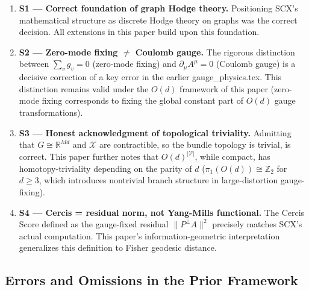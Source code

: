 \documentclass[12pt,a4paper]{article}
\theoremstyle{definition}
\theoremstyle{remark}
\theoremstyle{definition}
\newcommand{\R}{\mathbb{R}}
\newcommand{\Z}{\mathbb{Z}}
\newcommand{\Od}{O(d)}
\newcommand{\verts}{\mathcal{V}}
\newcommand{\base}{\mathcal{X}}
\begin{document}
\begin{enumerate}[label=S\arabic*:, leftmargin=*]
    \item \textbf{S1 — Correct foundation of graph Hodge theory.}
    Positioning SCX's mathematical structure as discrete Hodge theory on graphs was the correct decision.
    All extensions in this paper build upon this foundation.

    \item \textbf{S2 — Zero-mode fixing $\neq$ Coulomb gauge.}
    The rigorous distinction between $\sum_v g_v = 0$ (zero-mode fixing) and $\partial_\mu A^\mu = 0$ (Coulomb gauge)
    is a decisive correction of a key error in the earlier gauge\_physics.tex.
    This distinction remains valid under the $O(d)$ framework of this paper (zero-mode fixing corresponds to fixing the global constant part of $O(d)$ gauge transformations).

    \item \textbf{S3 — Honest acknowledgment of topological triviality.}
    Admitting that $G \cong \R^{Md}$ and $\base$ are contractible, so the bundle topology is trivial, is correct.
    This paper further notes that $\Od^{|\verts|}$, while compact, has homotopy-triviality depending on the parity of $d$
    ($\pi_1(\Od) \cong \Z_2$ for $d \geq 3$, which introduces nontrivial branch structure in large-distortion gauge-fixing).

    \item \textbf{S4 — Cercis = residual norm, not Yang-Mills functional.}
    The Cercis Score defined as the gauge-fixed residual $\|P^\perp A\|^2$ precisely matches SCX's actual computation.
    This paper's information-geometric interpretation generalizes this definition to Fisher geodesic distance.
\end{enumerate}

\subsection{Errors and Omissions in the Prior Framework}
\end{document}
